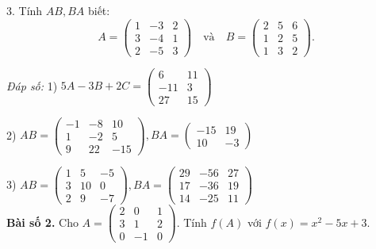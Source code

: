 3. Tính \( AB, BA \) biết:
\[
A = \begin{pmatrix}
1 & -3 & 2 \\
3 & -4 & 1 \\
2 & -5 & 3
\end{pmatrix}
\quad \text{và} \quad
B = \begin{pmatrix}
2 & 5 & 6 \\
1 & 2 & 5 \\
1 & 3 & 2
\end{pmatrix}.
\]

\textit{Đáp số:}
1) \( 5A - 3B + 2C = \begin{pmatrix}
6 & 11 \\
-11 & 3 \\
27 & 15
\end{pmatrix} \)

2) \( AB = \begin{pmatrix}
-1 & -8 & 10 \\
1 & -2 & 5 \\
9 & 22 & -15
\end{pmatrix},
BA = \begin{pmatrix}
-15 & 19 \\
10 & -3
\end{pmatrix} \)

3) \( AB = \begin{pmatrix}
1 & 5 & -5 \\
3 & 10 & 0 \\
2 & 9 & -7
\end{pmatrix},
BA = \begin{pmatrix}
29 & -56 & 27 \\
17 & -36 & 19 \\
14 & -25 & 11
\end{pmatrix} \)\\
\textbf{Bài số 2.} Cho \( A = \begin{pmatrix}
2 & 0 & 1 \\
3 & 1 & 2 \\
0 & -1 & 0
\end{pmatrix} \). Tính \( f(A) \) với \( f(x) = x^2 - 5x + 3 \).

